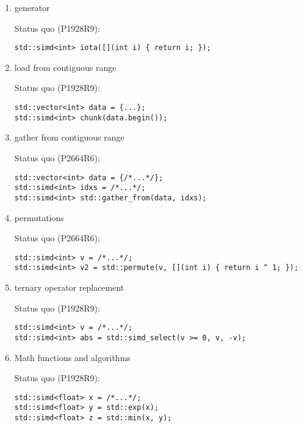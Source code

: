 \begin{enumerate}
  \item \label{fun:generator} \simd generator

    Status quo (P1928R9):
    \medskip\begin{lstlisting}[style=Vc]
std::simd<int> iota([](int i) { return i; });
    \end{lstlisting}

  \item \label{fun:load} \simd load from contiguous range

    Status quo (P1928R9):
    \medskip\begin{lstlisting}[style=Vc]
std::vector<int> data = {...};
std::simd<int> chunk(data.begin());
    \end{lstlisting}

  \item \label{fun:gather} \simd gather from contiguous range

    Status quo (P2664R6):
    \medskip\begin{lstlisting}[style=Vc]
std::vector<int> data = {/*...*/};
std::simd<int> idxs = /*...*/;
std::simd<int> std::gather_from(data, idxs);
    \end{lstlisting}

  \item \label{fun:permute} \simd permutations

    Status quo (P2664R6):
    \medskip\begin{lstlisting}[style=Vc]
std::simd<int> v = /*...*/;
std::simd<int> v2 = std::permute(v, [](int i) { return i ^ 1; });
    \end{lstlisting}

  \item \label{fun:select} \simd ternary operator replacement

    Status quo (P1928R9):
    \medskip\begin{lstlisting}[style=Vc]
std::simd<int> v = /*...*/;
std::simd<int> abs = std::simd_select(v >= 0, v, -v);
    \end{lstlisting}

  \item \label{fun:math} Math functions and algorithms

    Status quo (P1928R9):
    \medskip\begin{lstlisting}[style=Vc]
std::simd<float> x = /*...*/;
std::simd<float> y = std::exp(x);
std::simd<float> z = std::min(x, y);
    \end{lstlisting}


\end{enumerate}
